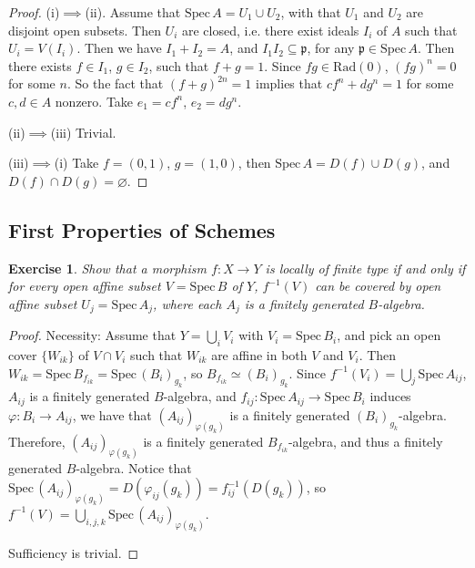 \documentclass{amsart}
\newtheorem{exe}{Exercise}[subsection]
\theoremstyle{remark}\newtheorem{rmk}[theorem]{Remark}
\begin{document}
\begin{proof}
(i)$\implies$(ii). Assume that $\mathrm{Spec}\,A=U_1\cup U_2$, with that $U_1$ and $U_2$ are disjoint open subsets. Then $U_i$ are closed, i.e. there exist ideals $I_i$ of $A$ such that $U_i=V(I_i)$.
Then we have $I_1+I_2=A$, and $I_1I_2\subseteq \mathfrak{p}$,  for any $\mathfrak{p}\in \mathrm{Spec}\,A$. Then there exists $f\in I_1$, $g\in I_2$, such that $f+g=1$. Since $fg\in \mathrm{Rad}(0)$,
$(fg)^n=0$ for some $n$. So the fact that $(f+g)^{2n}=1$ implies that $cf^n+dg^n=1$ for some $c,d\in A$ nonzero. Take $e_1=cf^n$, $e_2=dg^n$.

(ii)$\implies$(iii) Trivial.

(iii)$\implies$(i) Take $f=(0,1)$, $g=(1,0)$, then $\mathrm{Spec}\,A= D(f)\cup D(g)$, and $D(f)\cap D(g)=\varnothing$.
\end{proof}

\subsection{First Properties of Schemes}

\begin{exe}
	\label{2.3.1}
Show that a morphism $f: X\rightarrow Y $ is locally of finite type if and only if for every open affine
subset $V=\mathrm{Spec}\,B$ of $Y$, $f^{-1}(V)$ can be covered by open affine subset $U_j=\mathrm{Spec}\,A_j$, where each $A_j$ is a
finitely generated $B$-algebra.
\end{exe}

\begin{proof}
Necessity: Assume that $Y=\bigcup_i V_i$ with $V_i= \mathrm{Spec}\,B_i$, and pick an open cover $\{W_{ik}\}$ of $ V\cap V_i$ such that $W_{ik}$ are affine in both $V$ and $V_i$. Then $W_{ik}=\mathrm{Spec}\,B_{f_{ik}}=\mathrm{Spec}\,(B_{i})_{g_k}$, so $B_{f_{ik}}\simeq (B_{i})_{g_k}$. Since $f^{-1}(V_i)=\bigcup_j \mathrm{Spec}\,A_{ij}$, $A_{ij}$ is a finitely generated $B$-algebra, and
$f_{ij}:\mathrm{Spec}\,A_{ij}\rightarrow \mathrm{Spec}\,B_i$ induces $\varphi : B_i\rightarrow A_{ij} $, we have that $(A_{ij})_{\varphi(g_k)}$ is
a finitely generated $(B_{i})_{g_k}$-algebra. Therefore, $(A_{ij})_{\varphi(g_k)}$ is a finitely generated $B_{f_{ik}}$-algebra, and thus a finitely generated $B$-algebra. Notice that $\mathrm{Spec}\,(A_{ij})_{\varphi(g_k)}=D(\varphi _{ij}(g_k))=f_{ij}^{-1}(D(g_k))$, so 
$f^{-1}(V)=\bigcup_{i,j,k} \mathrm{Spec}\,(A_{ij})_{\varphi(g_k)}$.

 Sufficiency is trivial.
\end{proof}
\end{document}
